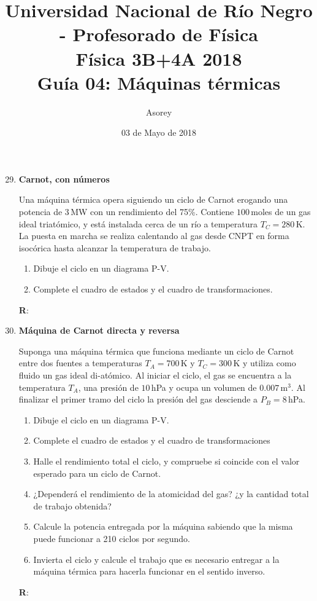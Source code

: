 \documentclass[a4paper,12pt]{article}
\begin{document}
\title{
{\normalsize{Universidad Nacional de Río Negro - Profesorado de Física}}\\
Física 3B+4A  2018 \\ Guía 04: Máquinas térmicas
}
\author{Asorey}
\date{03 de Mayo de 2018} 
\maketitle

\begin{enumerate}
	\setcounter{enumi}{28}      %

	\item {\bf{Carnot, con números}}

		Una máquina térmica opera siguiendo un ciclo de Carnot erogando una
		potencia de $3$\,MW con un rendimiento del 75\%.  Contiene $100$\,moles de
		un gas ideal triatómico, y está instalada cerca de un río a temperatura
		$T_C=280$\,K. La puesta en marcha se realiza calentando al gas desde
		CNPT en forma isocórica hasta alcanzar la temperatura de trabajo.
		\begin{enumerate}
			\item Dibuje el ciclo en un diagrama P-V.
			\item Complete el cuadro de estados y el cuadro de transformaciones.
		\end{enumerate}
		{\bf{R}}: 
	
	\item {\bf{Máquina de Carnot directa y reversa}}
		
		Suponga una máquina térmica que funciona mediante un ciclo de Carnot
		entre dos fuentes a temperaturas $T_A=700$\,K y $T_C=300$\,K y utiliza
		como fluido un gas ideal di-atómico. Al iniciar el ciclo, el gas se
		encuentra a la temperatura $T_A$, una presión de $10$\,hPa y ocupa un
		volumen de $0.007$\,m$^3$. Al finalizar el primer tramo del ciclo la
		presión del gas desciende a $P_B=8$\,hPa.
		\begin{enumerate}
			\item Dibuje el ciclo en un diagrama P-V.
			\item Complete el cuadro de estados y el cuadro de transformaciones
			\item Halle el rendimiento total el ciclo, y compruebe si coincide
				con el valor esperado para un ciclo de Carnot.
			\item ¿Dependerá el rendimiento de la atomicidad del gas? ¿y la
				cantidad total de trabajo obtenida?
			\item Calcule la potencia entregada por la máquina sabiendo que la
				misma puede funcionar a 210 ciclos por segundo.
			\item Invierta el ciclo y calcule el trabajo que es necesario
				entregar a la máquina térmica para hacerla funcionar en el
				sentido inverso.
		\end{enumerate}
		{\bf{R}}: 
	

\end{enumerate}
\end{document}

